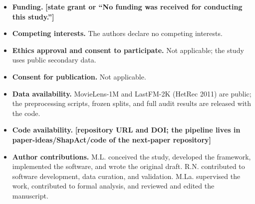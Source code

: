 \documentclass[pdflatex,sn-mathphys-num]{sn-jnl}
\theoremstyle{thmstyleone}%
\theoremstyle{thmstyletwo}%
\theoremstyle{thmstylethree}%
\newcommand{\tbd}[1]{\textbf{[#1]}}
\begin{document}
\begin{itemize}
\item \textbf{Funding.} \tbd{state grant or ``No funding was received for conducting this study.''}
\item \textbf{Competing interests.} The authors declare no competing interests.
\item \textbf{Ethics approval and consent to participate.} Not applicable; the study uses public secondary data.
\item \textbf{Consent for publication.} Not applicable.
\item \textbf{Data availability.} MovieLens-1M \cite{harper2015} and LastFM-2K (HetRec 2011) \cite{lastfm2011} are public; the preprocessing scripts, frozen splits, and full audit results are released with the code.
\item \textbf{Code availability.} \tbd{repository URL and DOI; the pipeline lives in paper-ideas/ShapAct/code of the next-paper repository}
\item \textbf{Author contributions.} M.L. conceived the study, developed the framework, implemented the software, and wrote the original draft. R.N. contributed to software development, data curation, and validation. M.La. supervised the work, contributed to formal analysis, and reviewed and edited the manuscript.
\end{itemize}
\end{document}
